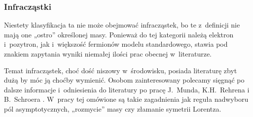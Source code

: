 \documentclass[10pt,t]{beamer}
\begin{document}
\begin{frame}
  \frametitle{Infracząstki}


  Niestety klasyfikacja ta \alert{nie} może obejmować infracząstek, bo
  te z~definicji nie mają one „ostro” określonej masy. Ponieważ do tej
  kategorii należą elektron i~pozytron, jak i~większość fermionów modelu
  standardowego, stawia pod znakiem zapytania wyniki niemałej ilości prac
  obecnej w~literaturze.

  Temat infracząstek, choć dość niszowy w~środowisku, posiada literaturę
  zbyt dużą by móc ją choćby wymienić. Osobom zainteresowany polecamy
  sięgnąć po dalsze informacje i~odniesienia do literatury po pracę
  J.~Munda, K.H.~Rehrena i B.~Schroera
  \parencite{Mund-Rehren-Schroer-Infraparticle-quantum-fiels-ETC-Pub-2022}.
  W~pracy tej omówione są takie zagadnienia jak reguła nadwyboru pól
  asymptotycznych, „rozmycie” masy czy złamanie symetrii Lorentza.

\end{frame}
\end{document}
